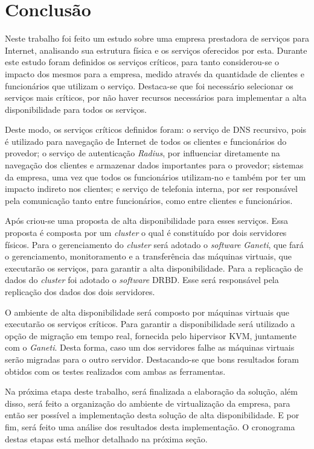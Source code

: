 \chapter{Conclusão}
\label{cap:conclusao}

Neste trabalho foi feito um estudo sobre uma empresa prestadora de serviços para Internet, analisando sua estrutura física e os serviços oferecidos 
por esta. Durante este estudo foram definidos os serviços críticos, para tanto considerou-se o impacto dos mesmos para a empresa, medido através
da quantidade de clientes e funcionários que utilizam o serviço. Destaca-se que foi necessário selecionar os serviços mais críticos, por não 
haver recursos necessários para implementar a alta disponibilidade para todos os serviços.

Deste modo, os serviços críticos definidos foram: o serviço de \ac{DNS} recursivo, pois é utilizado para navegação de Internet de todos os clientes 
e funcionários do provedor; o serviço de autenticação \textit{Radius}, por influenciar diretamente na navegação dos clientes e armazenar dados 
importantes para o provedor; sistemas da empresa, uma vez que todos os funcionários utilizam-no e também por ter um impacto indireto nos 
clientes; e serviço de telefonia interna, por ser responsável pela comunicação tanto entre funcionários, como entre clientes e funcionários.

Após criou-se uma proposta de alta disponibilidade para esses serviços. Essa proposta é composta por um \textit{cluster} o qual é constituído 
por dois servidores físicos. Para o gerenciamento do \textit{cluster} será adotado o \textit{software} \textit{Ganeti}, que fará o gerenciamento, 
monitoramento e a transferência das máquinas virtuais, que executarão os serviços, para garantir a alta disponibilidade. Para a replicação de dados 
do \textit{cluster} foi adotado o \textit{software} \ac{DRBD}. Esse será responsável pela replicação dos dados dos dois servidores.

O ambiente de alta disponibilidade será composto por máquinas virtuais que executarão os serviços críticos. Para garantir a disponibilidade 
será utilizado a opção de migração em tempo real, fornecida pelo hipervisor \ac{KVM}, juntamente com o \textit{Ganeti}. Desta forma, 
caso um dos servidores falhe as máquinas virtuais serão migradas para o outro servidor. Destacando-se que bons resultados foram obtidos com os 
testes realizados com ambas as ferramentas.

Na próxima etapa deste trabalho, será finalizada a elaboração da solução, além disso, será feito a organização do ambiente de virtualização 
da empresa, para então ser possível a implementação desta solução de alta disponibilidade. E por fim, será feito uma análise dos resultados 
desta implementação. O cronograma destas etapas está melhor detalhado na próxima seção.

